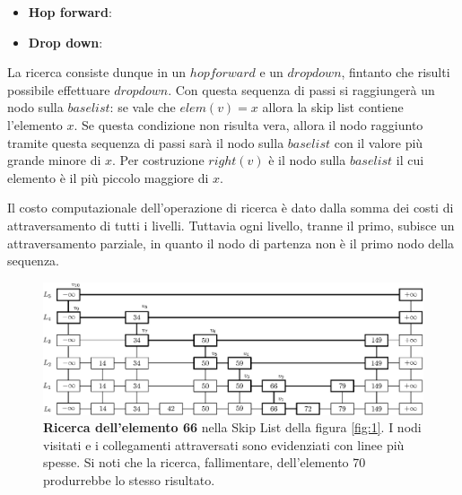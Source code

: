 			\begin{itemize}
			
			\item \textbf{Hop forward}:
				\begin{algorithm}[H]
				\end{algorithm}
			
			\item \textbf{Drop down}:
				\begin{algorithm}[H]
				\end{algorithm}
			\end{itemize} 
			
			La ricerca consiste dunque in un $ hop forward $ e un $ drop down $, fintanto che risulti possibile effettuare $ dropdown $.  Con questa sequenza di passi si raggiungerà un nodo sulla $ base list $: se vale che $ elem(v) = x $ allora la skip list contiene l'elemento $ x $. Se questa condizione non risulta vera, allora il nodo raggiunto tramite questa sequenza di passi sarà il nodo sulla $ base list $ con il valore più grande minore di $ x $. Per costruzione $ right(v) $ è il nodo sulla $ base list $ il cui elemento è il più piccolo maggiore di $ x $.
			
			Il costo computazionale dell'operazione di ricerca è dato dalla somma dei costi di attraversamento di tutti i livelli. Tuttavia ogni livello, tranne il primo, subisce un attraversamento parziale, in quanto il nodo di partenza non è il primo nodo della sequenza.
			
			
			\begin{figure}
				\centering
				\includegraphics[scale=0.6]{figure/search-66.eps}
				\caption{\textbf{Ricerca dell'elemento 66} nella Skip List della figura \ref{fig:1}. I nodi visitati e i collegamenti attraversati sono evidenziati con linee più spesse. Si noti che la ricerca, fallimentare, dell'elemento 70 produrrebbe lo stesso risultato.}\label{fig:2}
			\end{figure}
			
